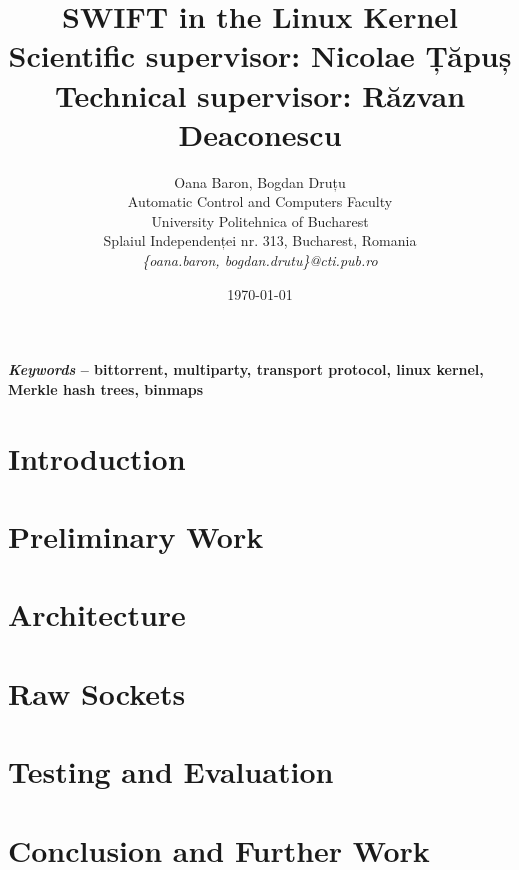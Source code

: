 \documentclass[12pt]{article}
\title{\bfseries{SWIFT in the Linux Kernel\\
\large{\vspace*{0.4cm}Scientific supervisor: Nicolae Țăpuș\\ Technical supervisor: Răzvan Deaconescu}}}
\author{Oana Baron, Bogdan Druțu\\
Automatic Control and Computers Faculty\\
University Politehnica of Bucharest\\
Splaiul Independenței nr. 313, Bucharest, Romania \\
\emph{\{oana.baron, bogdan.drutu\}@cti.pub.ro}}
\date{\today}
\begin{document}
\maketitle

%

{\bf \hspace*{0.8cm} \textbf{\emph{Keywords}}  --  bittorrent, multiparty, transport protocol, linux kernel,\\
\hspace*{0.8cm} Merkle hash trees, binmaps}

\section{Introduction}
\label{sec:introduction}


\section{Preliminary Work}
\label{sec:preliminarywork}



\section{Architecture}
\label{sec:arch}


\section{Raw Sockets}
\label{sec:rawsock}


\section{Testing and Evaluation}
\label{sec:testing}



\section{Conclusion and Further Work}
\label{sec:summary}




\pagebreak



\end{document}
